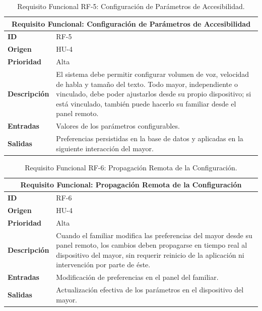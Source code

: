 \begin{table}[htbp]
    \centering
    \renewcommand{\arraystretch}{1.3}
    \begin{tabular}{|l|>{\raggedright\arraybackslash}p{}|}
        \hline
        \multicolumn{2}{|c|}{\textbf{Requisito Funcional: Configuración de Parámetros de Accesibilidad}} \\
        \hline
        \textbf{ID} & RF-5 \\
        \hline
        \textbf{Origen} & HU-4 \\
        \hline
        \textbf{Prioridad} & Alta \\
        \hline
        \textbf{Descripción} & El sistema debe permitir configurar volumen de voz, velocidad de habla y
            tamaño del texto. Todo mayor, independiente o vinculado, debe poder ajustarlos desde su
            propio dispositivo; si está vinculado, también puede hacerlo su familiar desde el panel
            remoto. \\
        \hline
        \textbf{Entradas} & Valores de los parámetros configurables. \\
        \hline
        \textbf{Salidas} & Preferencias persistidas en la base de datos y aplicadas en la siguiente
            interacción del mayor. \\
        \hline
    \end{tabular}
    \caption{Requisito Funcional RF-5: Configuración de Parámetros de Accesibilidad.}
    \label{tab:rf5}
\end{table}

\begin{table}[htbp]
    \centering
    \renewcommand{\arraystretch}{1.3}
    \begin{tabular}{|l|>{\raggedright\arraybackslash}p{}|}
        \hline
        \multicolumn{2}{|c|}{\textbf{Requisito Funcional: Propagación Remota de la Configuración}} \\
        \hline
        \textbf{ID} & RF-6 \\
        \hline
        \textbf{Origen} & HU-4 \\
        \hline
        \textbf{Prioridad} & Alta \\
        \hline
        \textbf{Descripción} & Cuando el familiar modifica las preferencias del mayor desde su panel
            remoto, los cambios deben propagarse en tiempo real al dispositivo del mayor, sin requerir
            reinicio de la aplicación ni intervención por parte de éste. \\
        \hline
        \textbf{Entradas} & Modificación de preferencias en el panel del familiar. \\
        \hline
        \textbf{Salidas} & Actualización efectiva de los parámetros en el dispositivo del mayor. \\
        \hline
    \end{tabular}
    \caption{Requisito Funcional RF-6: Propagación Remota de la Configuración.}
    \label{tab:rf6}
\end{table}

